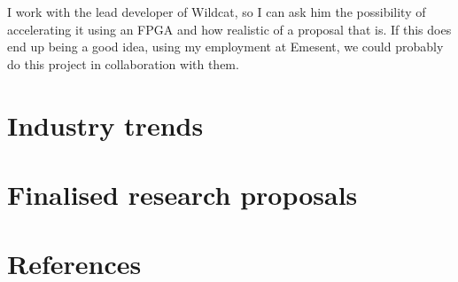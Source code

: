 \documentclass[12pt]{article}
\begin{document}

I work with the lead developer of Wildcat, so I can ask him the possibility of
accelerating it using an FPGA and how realistic of a proposal that is. If this does end up being a good idea,
using my employment at Emesent, we could probably do this project in collaboration with them.

%

\section{Industry trends}

\section{Finalised research proposals}

\section{References}
\printbibliography[heading=none]
\end{document}
